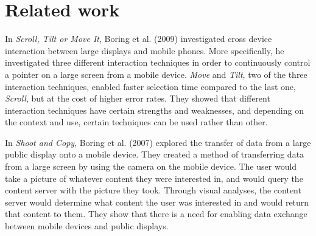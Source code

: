 \section{Related work} \label{sec:relatedwork}

In \textit{Scroll, Tilt or Move It}, Boring et al. (2009)  investigated cross device interaction between large displays and mobile phones. More specifically, he investigated three different interaction techniques in order to continuously control a pointer on a large screen from a mobile device. \textit{Move} and \textit{Tilt}, two of the three interaction techniques, enabled faster selection time compared to the last one, \textit{Scroll}, but at the cost of higher error rates. They showed that different interaction techniques have certain strengths and weaknesses, and depending on the context and use, certain techniques can be used rather than other. 

In \textit{Shoot and Copy}, Boring et al. (2007)  explored the transfer of data from a large public display onto a mobile device. They created a method of transferring data from a large screen by using the camera on the mobile device. The user would take a picture of whatever content they were interested in, and would query the content server with the picture they took. Through visual analyses, the content server would determine what content the user was interested in and would return that content to them. They show that there is a need for enabling data exchange between mobile devices and public displays.  